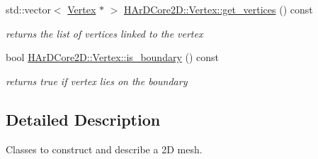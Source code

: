 \begin{DoxyCompactItemize}
std\+::vector$<$ \hyperlink{classHArDCore2D_1_1Vertex}{Vertex} $\ast$ $>$ \hyperlink{group__Mesh_ga67a622b04ce68250a53bc0825487bb6e}{H\+Ar\+D\+Core2\+D\+::\+Vertex\+::get\+\_\+vertices} () const
\begin{DoxyCompactList}\small\item\em returns the list of vertices linked to the vertex \end{DoxyCompactList}\item 
\mbox{\label{group__Mesh_gaea5f04b0b268e3de29d3de7d9034b4fc}} 
bool \hyperlink{group__Mesh_gaea5f04b0b268e3de29d3de7d9034b4fc}{H\+Ar\+D\+Core2\+D\+::\+Vertex\+::is\+\_\+boundary} () const
\begin{DoxyCompactList}\small\item\em returns true if vertex lies on the boundary \end{DoxyCompactList}\end{DoxyCompactItemize}


\subsection{Detailed Description}
Classes to construct and describe a 2D mesh. 

